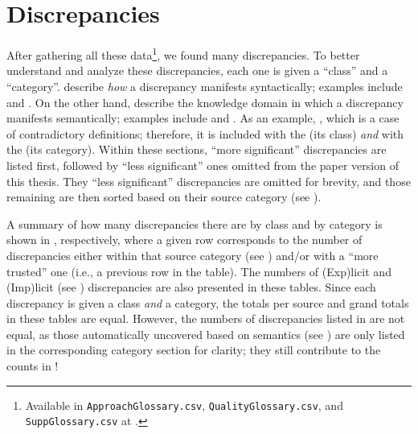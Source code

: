 \section{Discrepancies}
\label{discrep}


After gathering all these data\footnote{Available in \texttt{ApproachGlossary.csv},
    \texttt{QualityGlossary.csv}, and \texttt{SuppGlossary.csv} at .}, we found many
discrepancies. To better understand and analyze these discrepancies, each one
is given a ``class'' and a ``category''.  describe
\emph{how} a discrepancy manifests syntactically; examples include 
and . On the other hand,  describe the
knowledge domain in which a discrepancy manifests semantically; examples include
 and . As an example, \tourDiscrep*{}, which is a
case of contradictory definitions; therefore, it is included with the
 (its class) \emph{and} with the  (its category).
Within these sections, \ifnotpaper ``more significant'' discrepancies are
    listed first, followed by ``less significant'' ones omitted from the paper
    version of this thesis. They \else ``less significant'' discrepancies are
    omitted for brevity, and those remaining \fi are then sorted based on their
source category (see ).

A summary of how many discrepancies there are by class and by category is shown
in , respectively, where a given row
corresponds to the number of discrepancies either within that
source category (see ) and/or with a ``more trusted'' one
(i.e., a previous row in the table). The numbers of (Exp)licit and (Imp)licit
(see ) discrepancies are also presented in these tables. Since
each discrepancy is given a class \emph{and} a category, the totals per source
and grand totals in these tables are equal. However, the numbers of
discrepancies listed in  are not equal,
as those automatically uncovered based on semantics \ifnotpaper
    (see ) \fi are only listed in the corresponding
category section for clarity; they still contribute to the counts in
!

